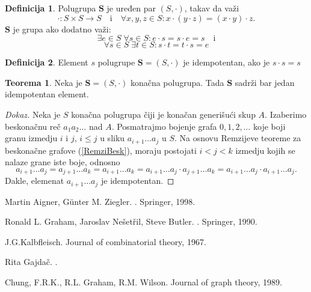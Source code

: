 \documentclass{article}
\theoremstyle{definition}
\newtheorem{definicija}{Definicija}[section]
\newtheorem{teorema}{Teorema}[section]
\newcommand{\dokaz}[1]{\begin{proof}[Dokaz]#1\end{proof}}
\begin{document}
	\begin{definicija}
		Polugrupa $\mathbf{S}$ je uređen par $(S,\cdot)$, takav da važi
		\[
			\cdot:S\times S \rightarrow S \quad\mathrm{i}\quad \forall x,y,z\in S: x\cdot (y\cdot z)=(x\cdot y)\cdot z.
		\]
		$\mathbf{S}$ je grupa ako dodatno važi:
		\[
			\exists e\in S\; \forall s \in S: e\cdot s=s\cdot e=s \quad \mathrm{i}
		\]
		\[
		\forall s\in S\; \exists t \in S: s\cdot t=t\cdot s=e
		\]
	\end{definicija}
	\begin{definicija}
		Element $s$ polugrupe $\mathbf{S}=(S,\cdot)$ je idempotentan, ako je $s\cdot s=s$ 
	\end{definicija}
	\begin{teorema}
		Neka je $\mathbf{S}=(S,\cdot)$ konačna polugrupa. Tada $\mathbf{S}$ sadrži bar jedan idempotentan element.
	\end{teorema}
	\dokaz{
		Neka je $S$ konačna polugrupa čiji je konačan generišući skup $A$. Izaberimo beskonačnu reč $a_1 a_2\ldots$ nad $A$. Posmatrajmo bojenje  grafa $0,1,2,\ldots$ koje boji granu izmedju $i$ i $j$, $i\leq j$ u sliku $a_{i+1} \ldots a_j$ u $S$. Na osnovu Remzijeve teoreme za beskonačne grafove (\ref{RemziBesk}), moraju postojati $i<j<k$ izmedju kojih se nalaze grane iste boje, odnosno
		\[
			a_{i+1}\ldots a_j=a_{j+1}\ldots a_k=a_{i+1}\ldots a_k=	a_{i+1}\ldots a_j\cdot 	a_{j+1}\ldots a_k=a_{i+1}\ldots a_j\cdot 	a_{i+1}\ldots a_j.
		\]
		Dakle, elemenat $a_{i+1}\ldots a_j$ je idempotentan.
		
	}
		\newpage

	\begin{thebibliography}{99}
		Martin Aigner, Günter M. Ziegler.
		.
		\newblock Springer, 1998.

		Ronald L. Graham, Jaroslav Nešetřil, Steve Butler.
		.
		\newblock Springer, 1990.
		
		J.G.Kalbfleisch.
		\newblock Journal of combinatorial theory, 1967.
		
		Rita Gajdač.
		.
		
		Chung, F.R.K., R.L. Graham, R.M. Wilson.
		\newblock Journal of graph theory, 1989.



	\end{thebibliography}	

	
\end{document}
